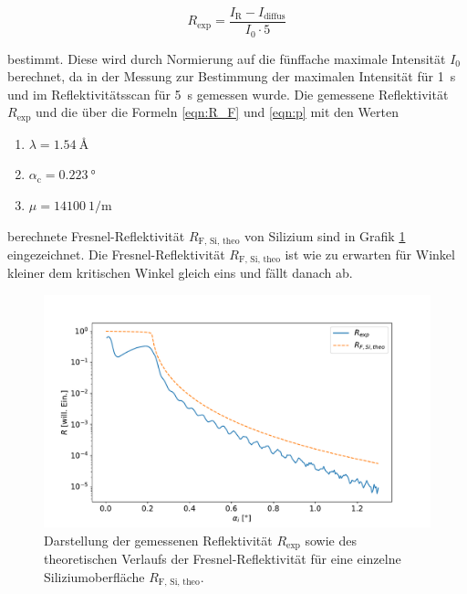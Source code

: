     \begin{equation*}
      R_{\text{exp}} = \frac{I_{\text{R}} - I_{\text{diffus}}}{I_0 \cdot 5}
    \end{equation*}
    
    bestimmt. Diese wird durch Normierung auf die fünffache maximale Intensität $I_0$ berechnet, da in der Messung zur Bestimmung der maximalen Intensität für \SI{1}{\second} und im Reflektivitätsscan für
    \SI{5}{\second} gemessen wurde. Die gemessene Reflektivität $R_{\text{exp}}$ und die über die Formeln \ref{eqn:R_F} und \ref{eqn:p} mit den Werten

    \begin{enumerate}
      \item $\lambda = \SI{1.54}{\angstrom}$
      \item $\alpha_{\text{c}} = \SI{0.223}{\degree}$
      \item $\mu = \SI{14100}{1\per\metre}$
    \end{enumerate}

    berechnete Fresnel-Reflektivität $R_{\text{F, Si, theo}}$ von Silizium sind in Grafik \ref{fig:Reflektivität_exp} eingezeichnet. Die Fresnel-Reflektivität $R_{\text{F, Si, theo}}$ ist wie zu erwarten für 
    Winkel kleiner dem kritischen Winkel gleich eins und fällt danach ab.

    \FloatBarrier
    \begin{figure}[h]
        \centering
        \includegraphics[width = \textwidth]{reflectivity_exp.pdf}
        \caption{Darstellung der gemessenen Reflektivität $R_{\text{exp}}$ sowie des theoretischen Verlaufs der Fresnel-Reflektivität für eine einzelne Siliziumoberfläche $R_{\text{F, Si, theo}}$.}
        \label{fig:Reflektivität_exp}
      \end{figure}
   
